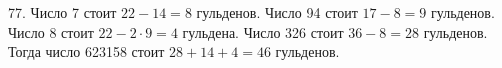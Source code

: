 77. Число 7 стоит $22-14=8$ гульденов. Число 94 стоит $17-8=9$ гульденов. Число 8 стоит $22-2\cdot9=4$ гульдена. Число 326 стоит $36-8=28$ гульденов. Тогда число 623158 стоит $28+14+4=46$ гульденов.\\

